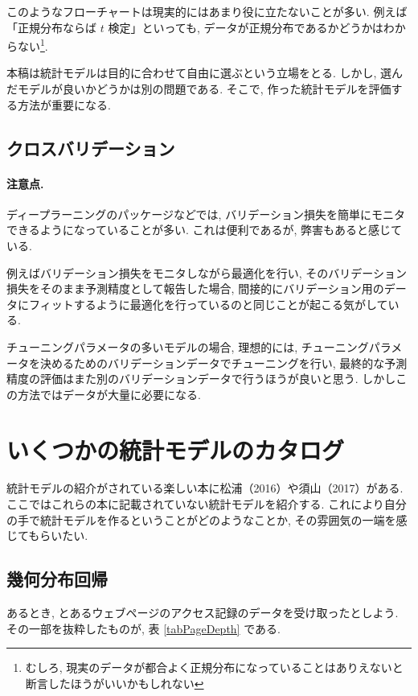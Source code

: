 \documentclass[a4paper, 12pt]{jarticle}
\begin{document}
このようなフローチャートは現実的にはあまり役に立たないことが多い. 例えば「正規分布ならば $t$ 検定」といっても, データが正規分布であるかどうかはわからない\footnote{むしろ, 現実のデータが都合よく正規分布になっていることはありえないと断言したほうがいいかもしれない}. 

本稿は統計モデルは目的に合わせて自由に選ぶという立場をとる. しかし, 選んだモデルが良いかどうかは別の問題である. 
そこで, 作った統計モデルを評価する方法が重要になる.


\subsection{クロスバリデーション}

\paragraph{注意点.}
ディープラーニングのパッケージなどでは, バリデーション損失を簡単にモニタできるようになっていることが多い. これは便利であるが, 弊害もあると感じている.

例えばバリデーション損失をモニタしながら最適化を行い, そのバリデーション損失をそのまま予測精度として報告した場合, 間接的にバリデーション用のデータにフィットするように最適化を行っているのと同じことが起こる気がしている. 

チューニングパラメータの多いモデルの場合, 理想的には, チューニングパラメータを決めるためのバリデーションデータでチューニングを行い, 最終的な予測精度の評価はまた別のバリデーションデータで行うほうが良いと思う. しかしこの方法ではデータが大量に必要になる. 


\section{いくつかの統計モデルのカタログ}
\label{secCata}

統計モデルの紹介がされている楽しい本に松浦（2016）や須山（2017）がある.
ここではこれらの本に記載されていない統計モデルを紹介する. これにより自分の手で統計モデルを作るということがどのようなことか, その雰囲気の一端を感じてもらいたい. 

\subsection{幾何分布回帰}

あるとき, とあるウェブページのアクセス記録のデータを受け取ったとしよう. 
その一部を抜粋したものが, 表 \ref{tabPageDepth} である.
\end{document}
